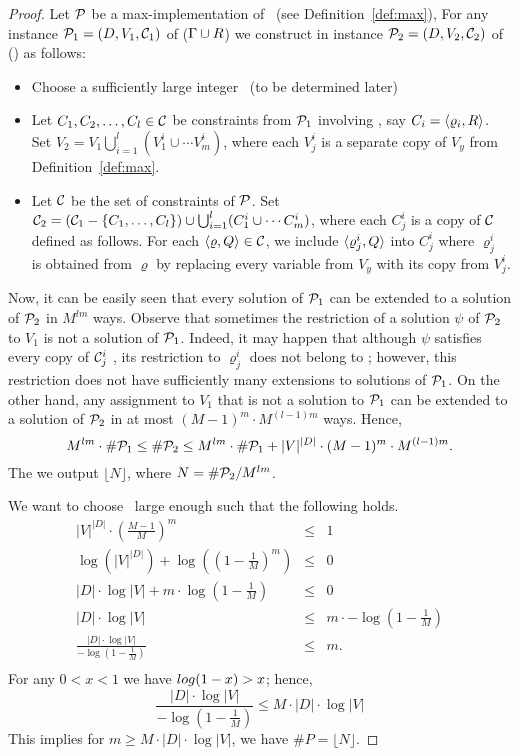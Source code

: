 \begin{proof}
Let \(\mathcal{P}\) be a max-implementation of \mR\ (see Definition~\ref{def:max}),
For any instance \(\mathcal{P}_1=(D,V_1,\mathcal{C}_1)\) of \ccsp(\(\Gamma \cup R\))
we construct in instance \(\mathcal{P}_2=(D,V_2,\mathcal{C}_2)\) of \ccsp(\mrelset) as follows:
\begin{itemize}
\item Choose a sufficiently large integer \mm\ (to be determined later)
\item Let \(C_1,C_2,\dotsc, C_l \in \mathcal{C}\) be constraints from \(\mathcal{P}_1\) involving \mR, say
\(C_i=\langle \varrho_i, R \rangle\)\@. Set \(V_2 = V_1 \bigcup_{i=1}^l (V_1^i \cup \dotsb V_m^i)\), where each 
\(V_j^i\) is a separate copy of \(V_y\) from Definition~\ref{def:max}\@.
\item Let \(\mathcal{C}\) be the set of constraints of \(\mathcal{P}\)\@. Set \(\mathcal{C}_2 = (\mathcal{C}_1 - \{C_1,\dotsc,C_l\}) \cup 
\bigcup_{i=1}^l(C_1^i\cup \dotsb C_m^i)\), where each \(C_j^i\) is a copy of \(\mathcal{C}\) defined as follows.
For each \(\langle \varrho, Q \rangle \in \mathcal{C}\), we include \(\langle \varrho_j^i,Q \rangle\) into \(C_j^i\)
where \(\varrho_j^i\) is obtained from \(\varrho\) by replacing every variable from \(V_y\) 
with its copy from \(V_j^i\)\@.
\end{itemize}
Now, it can be easily seen that every solution of \(\mathcal{P}_1\) can be extended to a solution of \(\mathcal{P}_2\)
in \(M^{lm}\) ways. Observe that sometimes the restriction of a solution \(\psi\)
of \(\mathcal{P}_2\) to \(V_1\) is not a solution of \(\mathcal{P}_1\)\@. Indeed, it may happen that
although \(\psi\) satisfies every copy of \(\mathcal{C}_j^i\) ,
its restriction to \(\varrho_j^i\) does not belong to \mR; however, this restriction does not have
sufficiently many extensions to solutions of \(\mathcal{P}_1\)\@.
On the other hand, any assignment to \(V_1\) that is not a solution to
\(\mathcal{P}_1\) can be extended to a solution of \(\mathcal{P}_2\) in at most \((M-1)^m\cdot M^{(l-1)m}\)
ways. Hence, 
\[M^{lm}\cdot \#\mathcal{P}_1 \le  \#\mathcal{P}_2  
 \le  M^{lm} \cdot \#\mathcal{P}_1 + |V|^{|D|} \cdot (M-1)^{m} \cdot M ^{(l-1)m}.
 \]
The we output \(\lfloor N \rfloor\), where \(N=\#\mathcal{P}_2/M^{lm}\)\@.

We want to choose \mm\ large enough such that the following holds.
\begin{eqnarray*}
|V|^{|D|} \cdot \left(\frac{M-1}{M}\right)^{m} & \le & 1 \\
\log (|V|^{|D|}) + \log\left( \left(1-\frac{1}{M}\right)^{m} \right) & \le &  0 \\
|D| \cdot \log |V| + m \cdot \log \left(1-\frac{1}{M}\right) & \le & 0 \\ 
|D| \cdot \log |V| & \le & m \cdot -\log \left(1-\frac{1}{M}\right) \\ 
\frac{|D| \cdot \log |V|}{-\log \left(1-\frac{1}{M}\right)} & \le & m.\\
\end{eqnarray*}
For any \(0<x<1\) we have \(\-log (1-x) > x \); hence, 
\[
\frac{|D| \cdot \log |V|}{-\log \left(1-\frac{1}{M}\right)} \le 
M \cdot |D| \cdot \log |V|
\]
This implies for \(m \ge M \cdot |D| \cdot \log |V|\), we have 
\(\#P=\lfloor N \rfloor\)\@.
\end{proof}

